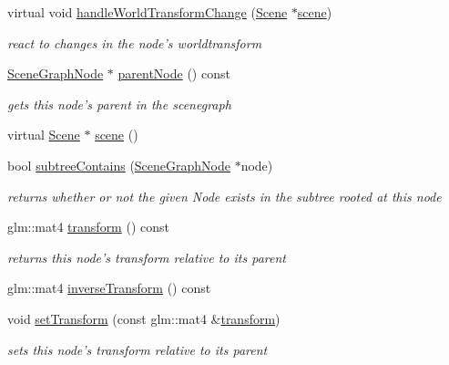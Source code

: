\begin{DoxyCompactItemize}
virtual void \hyperlink{classmotorcar_1_1SceneGraphNode_ad81e5f74bf448c2be1dc9f536d6d98b6}{handle\-World\-Transform\-Change} (\hyperlink{classmotorcar_1_1Scene}{Scene} $\ast$\hyperlink{classmotorcar_1_1SceneGraphNode_aa14e637ed4ae98f77e28941a4b5cfdd8}{scene})
\begin{DoxyCompactList}\small\item\em react to changes in the node's worldtransform \end{DoxyCompactList}\item 
\hyperlink{classmotorcar_1_1SceneGraphNode}{Scene\-Graph\-Node} $\ast$ \hyperlink{classmotorcar_1_1SceneGraphNode_a57dd5826ed6bf15c8a879f5a090c6000}{parent\-Node} () const 
\begin{DoxyCompactList}\small\item\em gets this node's parent in the scenegraph \end{DoxyCompactList}\item 
virtual \hyperlink{classmotorcar_1_1Scene}{Scene} $\ast$ \hyperlink{classmotorcar_1_1SceneGraphNode_aa14e637ed4ae98f77e28941a4b5cfdd8}{scene} ()
\item 
bool \hyperlink{classmotorcar_1_1SceneGraphNode_ac2be631270bc40cb1e070983c30a323f}{subtree\-Contains} (\hyperlink{classmotorcar_1_1SceneGraphNode}{Scene\-Graph\-Node} $\ast$node)
\begin{DoxyCompactList}\small\item\em returns whether or not the given Node exists in the subtree rooted at this node \end{DoxyCompactList}\item 
glm\-::mat4 \hyperlink{classmotorcar_1_1SceneGraphNode_ad96e79fdd739ac8223a3128003be391a}{transform} () const 
\begin{DoxyCompactList}\small\item\em returns this node's transform relative to its parent \end{DoxyCompactList}\item 
glm\-::mat4 \hyperlink{classmotorcar_1_1SceneGraphNode_af8b8174098f1de1067541f0e3ebec72e}{inverse\-Transform} () const 
\item 
void \hyperlink{classmotorcar_1_1SceneGraphNode_a7cd7700336833efa89c8004e85a1fd61}{set\-Transform} (const glm\-::mat4 \&\hyperlink{classmotorcar_1_1SceneGraphNode_ad96e79fdd739ac8223a3128003be391a}{transform})
\begin{DoxyCompactList}\small\item\em sets this node's transform relative to its parent \end{DoxyCompactList}\item 

\end{DoxyCompactItemize}
